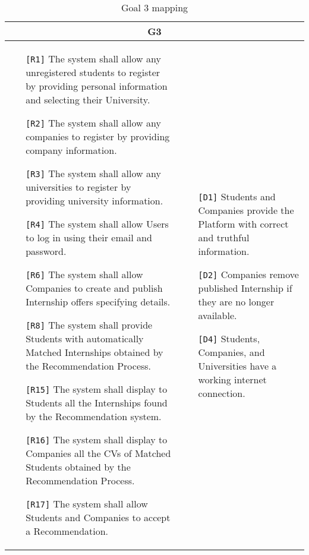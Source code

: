 \begin{table}[H]
 \centering
 \begin{tabular}{|p{8cm}|p{8cm}|}
  \hline
  \multicolumn{2}{|c|}{G3} \\
  \hline
  \begin{itemize}
   \item[\texttt{[R1]}] The system shall allow any unregistered students to register by providing personal information and selecting their University.
   \item[\texttt{[R2]}] The system shall allow any companies to register by providing company information.
   \item[\texttt{[R3]}] The system shall allow any universities to register by providing university information.
   \item[\texttt{[R4]}] The system shall allow Users to log in using their email and password.
   \item[\texttt{[R6]}] The system shall allow Companies to create and publish Internship offers specifying details.
   \item[\texttt{[R8]}] The system shall provide Students with automatically Matched Internships obtained by the Recommendation Process.
   \item[\texttt{[R15]}] The system shall display to Students all the Internships found by the Recommendation system.
   \item[\texttt{[R16]}] The system shall display to Companies all the CVs of Matched Students obtained by the Recommendation Process.
   \item[\texttt{[R17]}] The system shall allow Students and Companies to accept a Recommendation.
  \end{itemize} &
  \begin{itemize}
   \item[\texttt{[D1]}] Students and Companies provide the Platform with correct and truthful information.
   \item[\texttt{[D2]}] Companies remove published Internship if they are no longer available.
   \item[\texttt{[D4]}] Students, Companies, and Universities have a working internet connection.
  \end{itemize} \\ \hline
 \end{tabular}
 \caption{Goal 3 mapping}
 \label{tab:G3}
\end{table}

